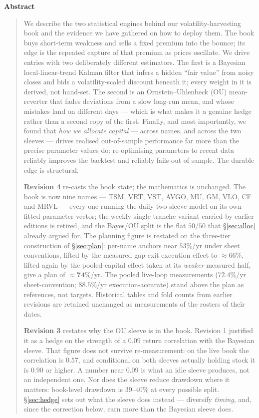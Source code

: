 \documentclass[11pt]{article}
\begin{document}
\begin{center}\textbf{Abstract}\end{center}
\begin{quote}\small
We describe the two statistical engines behind our volatility-harvesting book and the evidence we
have gathered on how to deploy them. The book buys short-term weakness and sells a fixed premium
into the bounce; its edge is the repeated capture of that premium as prices oscillate. We drive
entries with two deliberately different estimators. The first is a Bayesian local-linear-trend
Kalman filter that infers a hidden ``fair value'' from noisy closes and bids a volatility-scaled
discount beneath it; every weight in it is derived, not hand-set. The second is an
Ornstein--Uhlenbeck (OU) mean-reverter that fades deviations from a slow long-run mean, and whose
mistakes land on different days --- which is what makes it a genuine hedge rather than a second
copy of the first. Finally, and most importantly, we found that \emph{how we allocate capital}
--- across names, and across the two sleeves --- drives realised out-of-sample performance far
more than the precise parameter values do: re-optimising parameters to recent data reliably
improves the backtest and reliably fails out of sample. The durable edge is structural.

\textbf{Revision 4} re-casts the book state; the mathematics is unchanged. The book is now nine
names --- TSM, VRT, VST, AVGO, MU, GM, VLO, CF and MRVL --- every one running the daily
two-sleeve model on its own fitted parameter vector; the weekly single-tranche variant carried by
earlier editions is retired, and the Bayes/OU split is the flat $50/50$ that
\S\ref{sec:alloc} already argued for. The planning figure is restated on the three-tier
construction of \S\ref{sec:plan}: per-name anchors near $53\%$/yr under sheet conventions, lifted
by the measured gap-exit execution effect to $\approx66\%$, lifted again by the pooled-capital
effect taken at its \emph{weaker} measured half, give a plan of $\approx\mathbf{74\%}$/yr. The
pooled live-loop measurements ($72.4\%$/yr sheet-convention; $88.5\%$/yr execution-accurate)
stand above the plan as references, not targets. Historical tables and fold counts from earlier
revisions are retained unchanged as measurements of the rosters of their dates.

\textbf{Revision 3} restates why the OU sleeve is in the book. Revision 1 justified it as a
hedge on the strength of a $0.09$ return correlation with the Bayesian sleeve. That figure does
not survive re-measurement: on the live book the correlation is $0.57$, and conditional on both
sleeves actually holding stock it is $0.90$ or higher. A number near $0.09$ is what an idle
sleeve produces, not an independent one. Nor does the sleeve reduce drawdown where it matters:
book-level drawdown is $39$--$40\%$ at every possible split. \S\ref{sec:hedge} sets out what the
sleeve does instead --- diversify \emph{timing}, and, since the correction below, earn more than
the Bayesian sleeve does.


\end{quote}
\end{document}
